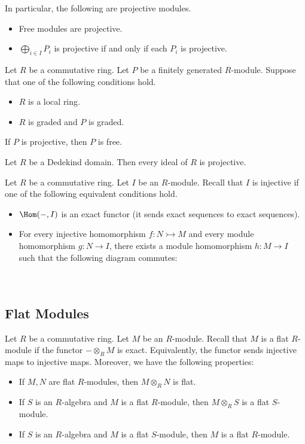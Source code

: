 \documentclass[a4paper]{article}
\begin{document}
In particular, the following are projective modules. 
\begin{itemize}
\item Free modules are projective. 
\item $\bigoplus_{i\in I}P_i$ is projective if and only if each $P_i$ is projective. 
\end{itemize}

\begin{prp}{}{} Let $R$ be a commutative ring. Let $P$ be a finitely generated $R$-module. Suppose that one of the following conditions hold. 
\begin{itemize}
\item $R$ is a local ring. 
\item $R$ is graded and $P$ is graded. 
\end{itemize}
If $P$ is projective, then $P$ is free. 
\end{prp}

\begin{prp}{}{} Let $R$ be a Dedekind domain. Then every ideal of $R$ is projective. 
\end{prp}

Let $R$ be a commutative ring. Let $I$ be an $R$-module. Recall that $I$ is injective if one of the following equivalent conditions hold. 
\begin{itemize}
\item $\Hom(-,I)$ is an exact functor (it sends exact sequences to exact sequences). 
\item For every injective homomorphism $f:N\rightarrowtail M$ and every module homomorphism $g:N\to I$, there exists a module homomorphism $h:M\to I$ such that the following diagram commutes: \\~\\
 \\
\end{itemize}

\subsection{Flat Modules}
Let $R$ be a commutative ring. Let $M$ be an $R$-module. Recall that $M$ is a flat $R$-module if the functor $-\otimes_R M$ is exact. Equivalently, the functor sends injective maps to injective maps. Moreover, we have the following properties: 
\begin{itemize}
\item If $M,N$ are flat $R$-modules, then $M\otimes_RN$ is flat. 
\item If $S$ is an $R$-algebra and $M$ is a flat $R$-module, then $M\otimes_R S$ is a flat $S$-module. 
\item If $S$ is an $R$-algebra and $M$ is a flat $S$-module, then $M$ is a flat $R$-module. 
\end{itemize}
\end{document}
